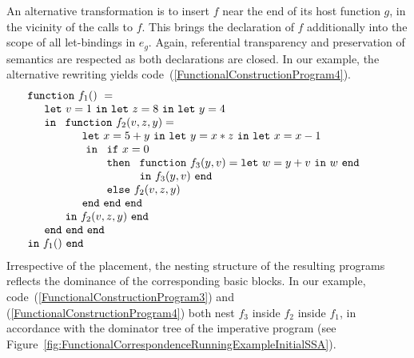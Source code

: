 An alternative transformation is to insert $f$ near the end of its
host function $g$, in the vicinity of the calls to $f$. This brings
the declaration of $f$ additionally into the scope of all let-bindings
in $e_g$. Again, referential transparency and preservation of
semantics are respected as both declarations are closed.  In our
example, the alternative rewriting yields
code~(\ref{FunctionalConstructionProgram4}).
\begin{equation}
\label{FunctionalConstructionProgram4}
\begin{array}{l}
\mathtt{function}\ f_1()\ = \\
  \quad
  \begin{array}{l}
     \mathtt{let}\ v = 1 \ 
     \mathtt{in\ let}\ z = 8 \ 
     \mathtt{in\ let}\ y = 4\\
     \mathtt{in}\ 
     \begin{array}[t]{l}
       \mathtt{function}\ f_2(v,z,y) =\\
         \quad
         \begin{array}{l}
           \mathtt{let}\ x = 5+y\
           \mathtt{in\ let}\ y = x*z\
           \mathtt{in\ let}\ x = x-1\\\
           \mathtt{in}\
           \begin{array}[t]{l}
             \mathtt{if}\ x=0\\ 
             \mathtt{then}\ 
               \begin{array}[t]{l}
                 \mathtt{function}\ f_3(y,v) = 
                 \mathtt{let}\ w = y+v\ \mathtt{in}\ w\ \mathtt{end}\\
                 \mathtt{in}\ f_3(y,v)\ \mathtt{end}
               \end{array}\\
             \mathtt{else}\ f_2(v,z,y)
           \end{array}\\
           \mathtt{end\ end\ end}
         \end{array}\\
     \mathtt{in}\ f_2(v,z,y)\ \mathtt{end}
     \end{array}\\
     \mathtt{end\ end\ end}\\
   \end{array}\\
\mathtt{in}\ f_1()\  \mathtt{end}
\end{array}
\end{equation}
Irrespective of the placement, the nesting structure of the resulting
programs reflects the dominance of the corresponding basic blocks. In
our example, code~(\ref{FunctionalConstructionProgram3}) and
(\ref{FunctionalConstructionProgram4}) both nest $f_3$ inside $f_2$
inside $f_1$, in accordance with the dominator tree of the imperative
program (see
Figure~\ref{fig:FunctionalCorrespondenceRunningExampleInitialSSA}).

